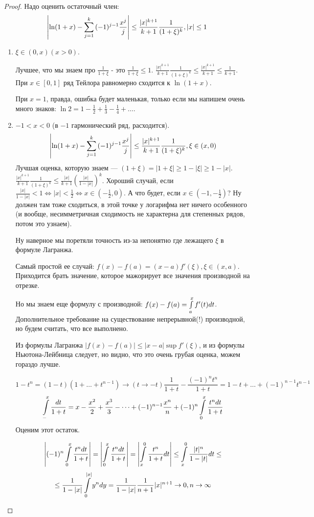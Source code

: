\documentclass[12pt]{report}
\begin{document}
\begin{proof}
Надо оценить остаточный член:
$$\left|\ln(1 + x) - \sum\limits_{j = 1}^k{(-1)^{j - 1}\frac{x^j}{j}}\right| \le \frac{|x|^{k + 1}}{k + 1}\frac{1}{(1 + \xi)^k}, |x| \le 1$$
\begin{enumerate}
\item $\xi \in (0, x) (x > 0)$.

Лучшее, что мы знаем про $\frac{1}{1 + \xi}$ - это $\frac{1}{1 + \xi} \le 1$. $\frac{|x|^{k + 1}}{k + 1}\frac{1}{(1 + \xi)^k} \le \frac{|x|^{k + 1}}{k + 1} \le \frac{1}{k + 1}$. При $x \in [0, 1]$ ряд Тейлора равномерно сходится к $\ln(1 + x)$.

При $x = 1$, правда, ошибка будет маленькая, только если мы напишем очень много знаков: $\ln{2} = 1 - \frac{1}{2} + \frac{1}{3} - \frac{1}{4} + \dots$.

\item $-1 < x < 0$ (в $-1$ гармонический ряд, расходится). 
$$\left|\ln(1 + x) - \sum\limits_{j = 1}^k{(-1)^{j - 1}\frac{x^j}{j}}\right| \le \frac{|x|^{k + 1}}{k + 1}\frac{1}{(1 + \xi)^k}, \xi \in (x, 0)$$
Лучшая оценка, которую знаем --- $(1 + \xi) = |1 + \xi| \ge 1 - |\xi| \ge 1 - |x|$. $\frac{|x|^{k + 1}}{k + 1}\frac{1}{(1 + \xi)^k} \le \frac{|x|}{k + 1}\left(\frac{|x|}{1 - |x|}\right)^k$. Хороший случай, если $\frac{|x|}{1 - |x|} < 1 \Leftrightarrow |x| < \frac{1}{2} \Leftrightarrow x \in (-\frac{1}{2}, 0)$. А что будет, если $x \in (-1, -\frac{1}{2})$? Ну должен там тоже сходиться, в этой точке у логарифма нет ничего особенного (и вообще, несимметричная сходимость не характерна для степенных рядов, потом это узнаем).

Ну наверное мы поретяли точность из-за непонятно где лежащего $\xi$ в формуле Лагранжа. 

Самый простой ее случай: $f(x) - f(a) = (x - a)f'(\xi), \xi \in (x, a)$. Приходится брать значение, которое мажорирует все значения производной на отрезке. 

Но мы знаем еще формулу с производной: $f(x) - f(a) = \int\limits_a^x{f'(t)dt}$. Дополнительное требование на существование непрерывной(!) производной, но будем считать, что все выполнено.

Из формулы Лагранжа $|f(x) - f(a)| \le |x - a|\sup{f'(\xi)}$, и из формулы Ньютона-Лейбница следует, но видно, что это очень грубая оценка, можем гораздо лучше. 

$$1 - t^n = (1 - t)(1 + \dots + t^{n - 1}) \to (t \to -t) \frac{1}{1 + t} - \frac{(-1)^nt^n}{1 + t} = 1 - t + \dots + (-1)^{n - 1}t^{n - 1}$$
$$\int\limits_-^x{\frac{dt}{1 + t}} = x - \frac{x^2}{2} + \frac{x^3}{3} - \dots + (-1)^{n - 1}\frac{x^n}{n} + (-1)^n\int\limits_0^x{\frac{t^n dt}{1 + t}}$$
Оценим этот остаток.

$$\left|(-1)^n\int\limits_0^x{\frac{t^n dt}{1 + t}}\right| = \left|\int\limits_0^x{\frac{t^n dt}{1 + t}}\right| = \left|\int\limits_x^0{\frac{t^n}{1 + t}dt}\right| \le \int\limits_x^0{\frac{|t|^n}{1 - |t|}dt} \le $$
$$ \le \frac{1}{1 - |x|}\int\limits_0^{|x|}{y^ndy} = \frac{1}{1 - |x|}\frac{1}{n + 1}|x|^{n + 1} \to 0, n \to \infty$$
\end{enumerate}
\end{proof}
\end{document}
